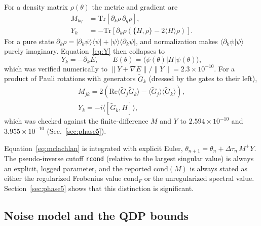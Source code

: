 \documentclass[aps,pra,reprint,superscriptaddress,nofootinbib]{revtex4-2}
\newcommand{\dt}{\Delta\tau}
\newcommand{\cond}{\mathrm{cond}}
\newcommand{\Tr}{\mathrm{Tr}}
\newcommand{\rcond}{\texttt{rcond}}
\begin{document}
For a density matrix $\rho(\theta)$ the metric and gradient are~\cite{QDP2024}
\begin{align}
  M_{kq} &= \Tr\!\left[\partial_k\rho\,\partial_q\rho\right], \label{eq:M}\\
  Y_k &= -\Tr\!\left[\partial_k\rho\left(\{H,\rho\}-2\langle H\rangle\rho\right)\right]. \label{eq:Y}
\end{align}
For a pure state $\partial_k\rho=|\partial_k\psi\rangle\langle\psi|+|\psi\rangle\langle\partial_k\psi|$,
and normalization makes $\langle\partial_k\psi|\psi\rangle$ purely imaginary. Equation~\eqref{eq:Y}
then collapses to
\begin{equation}
  Y_k = -\partial_k E,\qquad E(\theta)=\langle\psi(\theta)|H|\psi(\theta)\rangle,
  \label{eq:Ygrad}
\end{equation}
which was verified numerically to $\|Y+\nabla E\|/\|Y\|=2.3\times10^{-10}$. For a product of
Pauli rotations with generators $\tilde G_k$ (dressed by the gates to their left),
\begin{equation}
\begin{gathered}
  M_{jk}=2\left(\mathrm{Re}\langle\tilde G_j\tilde G_k\rangle-\langle\tilde G_j\rangle\langle\tilde G_k\rangle\right),\\
  Y_k=-i\langle[\tilde G_k,H]\rangle,
\end{gathered}
  \label{eq:stateform}
\end{equation}
which was checked against the finite-difference $M$ and $Y$ to $2.594\times10^{-10}$ and $3.955\times10^{-10}$
(Sec.~\ref{sec:phase5}).

Equation~\eqref{eq:mclachlan} is integrated with explicit Euler,
$\theta_{n+1}=\theta_n+\dt_n\,M^{+}Y$. The pseudo-inverse cutoff \rcond{} (relative to the
largest singular value) is always an explicit, logged parameter, and the reported $\cond(M)$
is always stated as either the regularized Frobenius value $\cond_F$ or the unregularized
spectral value. Section~\ref{sec:phase5} shows that this distinction is significant.

\subsection{Noise model and the QDP bounds}
\end{document}
